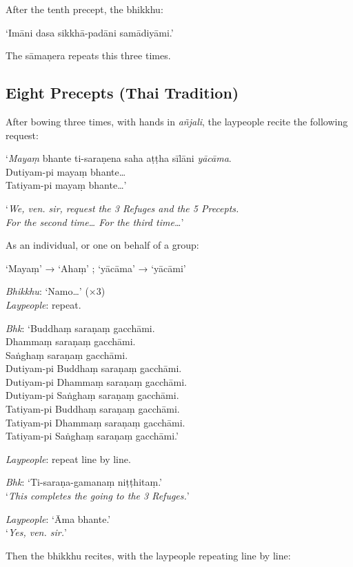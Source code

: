 After the tenth precept, the bhikkhu:

‘Imāni dasa sikkhā-padāni samādiyāmi.’

The sāmaṇera repeats this three times.


\subsection{Eight Precepts (Thai Tradition)}


After bowing three times, with hands in \emph{añjali}, the laypeople recite the
following request:

‘\emph{Mayaṃ} bhante ti-saraṇena saha aṭṭha sīlāni \emph{yācāma}.\\
Dutiyam-pi mayaṃ bhante…\\
Tatiyam-pi mayaṃ bhante…’

‘\emph{We, ven. sir, request the 3 Refuges and the 5 Precepts.\\
  For the second time… For the third time…}’

As an individual, or one on behalf of a group:

‘Mayaṃ’ → ‘Ahaṃ’ ; ‘yācāma’ → ‘yācāmi’

\emph{Bhikkhu}: ‘Namo…’ (×3)\\
\emph{Laypeople}: repeat.

\emph{Bhk}: ‘Buddhaṃ saraṇaṃ gacchāmi.\\
Dhammaṃ saraṇaṃ gacchāmi.\\
Saṅghaṃ saraṇaṃ gacchāmi.\\
Dutiyam-pi Buddhaṃ saraṇaṃ gacchāmi.\\
Dutiyam-pi Dhammaṃ saraṇaṃ gacchāmi.\\
Dutiyam-pi Saṅghaṃ saraṇaṃ gacchāmi.\\
Tatiyam-pi Buddhaṃ saraṇaṃ gacchāmi.\\
Tatiyam-pi Dhammaṃ saraṇaṃ gacchāmi.\\
Tatiyam-pi Saṅghaṃ saraṇaṃ gacchāmi.’

\emph{Laypeople}: repeat line by line.

\emph{Bhk}: ‘Ti-saraṇa-gamanaṃ niṭṭhitaṃ.’\\
‘\emph{This completes the going to the 3 Refuges.}’

\emph{Laypeople}: ‘Āma bhante.’\\
‘\emph{Yes, ven. sir.}’

Then the bhikkhu recites, with the laypeople repeating line by line:

